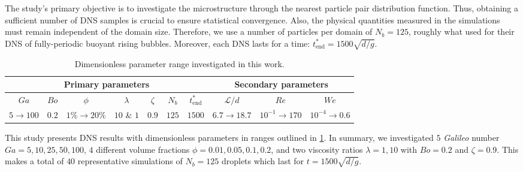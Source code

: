 The study's primary objective is to investigate the microstructure through the nearest particle pair distribution function.
Thus, obtaining a sufficient number of DNS samples is crucial to ensure statistical convergence. 
Also, the physical quantities measured in the simulations must remain independent of the domain size. 
Therefore, we use a number of particles per domain of $N_b = 125$, roughly what \citet{hidman2023assessing} used for their DNS of fully-periodic buoyant rising bubbles.
Moreover, each DNS lasts for a time: $t^*_\text{end} = 1500 \sqrt{d/g}$.
\begin{table}[h!]
    \centering
    \caption{Dimensionless parameter range investigated in this work.}
    \begin{tabular}{|ccccccc|ccc|}\hline
        \multicolumn{7}{|c|}{Primary parameters}&\multicolumn{3}{|c|}{Secondary parameters}\\\hline\hline
        $Ga$&$Bo$&$\phi$&$\lambda$&$\zeta$&$N_b$&$t^*_\text{end}$&$\mathcal{L}/d$&$Re$&$We$\\ \hline
        $5\rightarrow 100$&$0.2$&$1\% \rightarrow 20\%$&$10$ \& $1$&$0.9$&$125$&$1500$&$6.7\to 18.7$&$10^{-1}\to 170$&$10^{-4}\to 0.6$\\ \hline
    \end{tabular}
    \label{tab:simulations}
\end{table}
This study presents DNS results with dimensionless parameters in ranges outlined in \ref{tab:simulations}.
In summary, we investigated $5$ \textit{Galileo} number $Ga = 5,10,25,50,100$, $4$ different volume fractions $\phi = 0.01,0.05,0.1,0.2$, and two viscosity ratios $\lambda =1,10$ with $Bo = 0.2$ and $\zeta = 0.9$. %
This makes a total of $40$ representative simulations of $N_b = 125$ droplets which last for $t= 1500 \sqrt{d/g}$. 